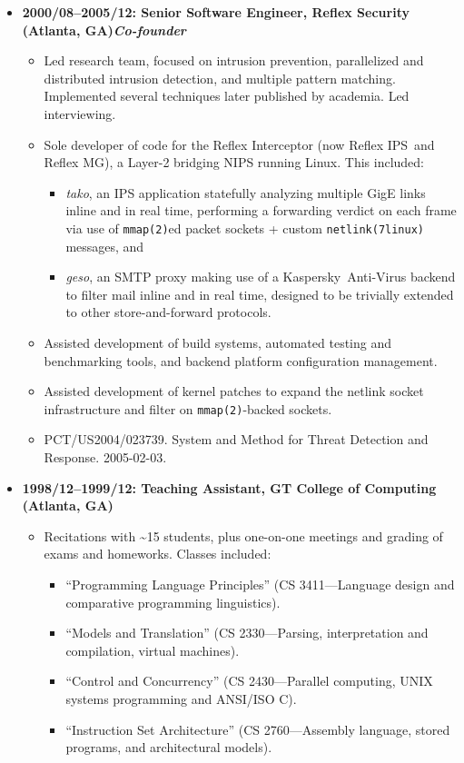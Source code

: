 \documentclass{article}
\newenvironment{tightitemize}
{\begin{itemize}
  \setlength{\itemsep}{1pt}
  \setlength{\parskip}{0pt}
  \setlength{\parsep}{0pt}}
{\end{itemize}}
\begin{document}
\begin{tightitemize}
\pagebreak

\item \textbf{2000/08--2005/12: Senior Software Engineer, Reflex Security (Atlanta, GA)\hfill \tiny{\textit{Co-founder}}}
\begin{tightitemize}
\item Led research team, focused on intrusion prevention, parallelized and
  distributed intrusion detection, and multiple pattern matching. Implemented
  several techniques later published by academia. Led interviewing.
\item Sole developer of code for the Reflex Interceptor (now Reflex IPS\texttrademark\ and
  Reflex MG\texttrademark), a Layer-2 bridging NIPS running Linux. This included:
\begin{tightitemize}
    \item \textit{tako}, an IPS application statefully analyzing multiple GigE links inline
      and in real time, performing a forwarding verdict on each frame via use
      of \texttt{mmap(2)}ed packet sockets + custom \texttt{netlink(7linux)} messages, and
    \item \textit{geso}, an SMTP proxy making use of a Kaspersky\texttrademark\ Anti-Virus backend to
      filter mail inline and in real time, designed to be trivially extended
      to other store-and-forward protocols.
\end{tightitemize}
\item Assisted development of build systems, automated testing and benchmarking tools, and backend
      platform configuration management.
\item Assisted development of kernel patches to expand the netlink socket
      infrastructure and filter on \texttt{mmap(2)}-backed sockets.
\item PCT/US2004/023739. System and Method for Threat Detection and Response. 2005-02-03.\hfill {}\\
\end{tightitemize}

\item \textbf{1998/12--1999/12: Teaching Assistant, GT College of Computing (Atlanta, GA)}
\begin{tightitemize}
\item Recitations with \textasciitilde15 students, plus one-on-one meetings and grading of exams
and homeworks. Classes included:
\begin{tightitemize}
\item ``Programming Language Principles'' (CS 3411---Language design and comparative programming linguistics).
\item ``Models and Translation'' (CS 2330---Parsing, interpretation and compilation, virtual machines).
\item ``Control and Concurrency'' (CS 2430---Parallel computing, UNIX systems programming and ANSI/ISO C).
\item ``Instruction Set Architecture'' (CS 2760---Assembly language, stored programs, and architectural models).\\
\end{tightitemize}
\end{tightitemize}


\end{tightitemize}
\end{document}
